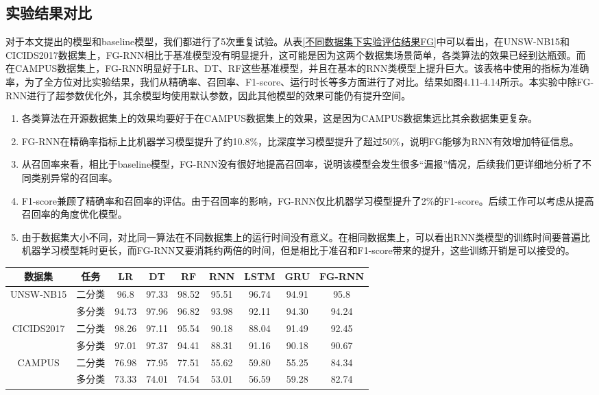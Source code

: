 \subsection{实验结果对比}
对于本文提出的模型和baseline模型，我们都进行了5次重复试验。从表\ref{不同数据集下实验评估结果FG}中可以看出，在UNSW-NB15和CICIDS2017数据集上，FG-RNN相比于基准模型没有明显提升，这可能是因为这两个数据集场景简单，各类算法的效果已经到达瓶颈。而在CAMPUS数据集上，FG-RNN明显好于LR、DT、RF这些基准模型，并且在基本的RNN类模型上提升巨大。该表格中使用的指标为准确率，为了全方位对比实验结果，我们从精确率、召回率、F1-score、运行时长等多方面进行了对比。结果如图4.11-4.14所示。本实验中除FG-RNN进行了超参数优化外，其余模型均使用默认参数，因此其他模型的效果可能仍有提升空间。
\begin{enumerate}
  \item 各类算法在开源数据集上的效果均要好于在CAMPUS数据集上的效果，这是因为CAMPUS数据集远比其余数据集更复杂。
  \item FG-RNN在精确率指标上比机器学习模型提升了约10.8\%，比深度学习模型提升了超过50\%，说明FG能够为RNN有效增加特征信息。
  \item 从召回率来看，相比于baseline模型，FG-RNN没有很好地提高召回率，说明该模型会发生很多“漏报”情况，后续我们更详细地分析了不同类别异常的召回率。
  \item F1-score兼顾了精确率和召回率的评估。由于召回率的影响，FG-RNN仅比机器学习模型提升了2\%的F1-score。后续工作可以考虑从提高召回率的角度优化模型。
  \item 由于数据集大小不同，对比同一算法在不同数据集上的运行时间没有意义。在相同数据集上，可以看出RNN类模型的训练时间要普遍比机器学习模型耗时更长，而FG-RNN又要消耗约两倍的时间，但是相比于准召和F1-score带来的提升，这些训练开销是可以接受的。
\end{enumerate}
\begin{table*}[h]
  \small
  \caption{不同数据集下实验评估结果(\%)}
  \label{不同数据集下实验评估结果FG}
  \centering
  \begin{tabular}{c|c|ccc|ccc|c}
  \toprule
  
    数据集 &  任务  &  
    LR &  DT & RF & RNN & LSTM & GRU & FG-RNN  \\
  \midrule
  
  UNSW-NB15 & 二分类 & 96.8 & 97.33 & 98.52 &  95.51 & 96.74 & 94.91 & 95.8 \\ 
  
  & 多分类 &94.73 & 97.96 & 96.82 & 93.98 & 92.11 & 94.30 & 94.24 \\
  
  \midrule
  CICIDS2017 & 二分类 & 98.26 & 97.11 & 95.54 & 90.18 & 88.04 & 91.49 & 92.45 \\
  & 多分类 & 97.01 & 97.37 & 94.41 & 88.31 & 91.16 & 90.18 & 90.67\\
  \midrule
  CAMPUS & 二分类 & 76.98 & 77.95 & 77.51 & 55.62 & 59.80 & 55.25 & 84.34 \\
  & 多分类 & 73.33 & 74.01 & 74.54 & 53.01 & 56.59 & 59.28 & 82.74\\
  
    \bottomrule
  
  \end{tabular}
  \end{table*}

